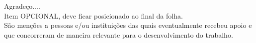 
\vspace*{18.5cm}
\hspace{0.4\textwidth}
\begin{varwidth}{0.48\textwidth}
  \leading{5mm}
  Agradeço....\\
  Item OPCIONAL, deve ficar posicionado ao final da folha.\\
  São menções a pessoas e/ou instituições das quais eventualmente recebeu apoio
  e que concorreram de maneira relevante para o desenvolvimento do trabalho.
\end{varwidth}
